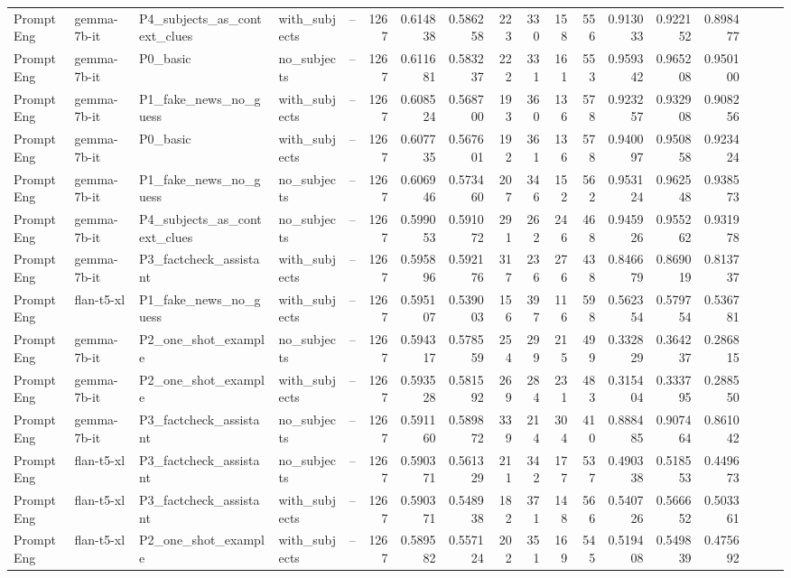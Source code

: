 \begin{landscape}
\begin{longtable}{l P{2.9cm} P{4cm} l P{2.2cm} r r r r r r r r r r r r r}
PromptEng & gemma-7b-it & P4\_subjects\_as\_context\_clues & with\_subjects & -- & 1267 & 0.614838 & 0.586258 & 223 & 330 & 158 & 556 & 0.913033 & 0.922152 & 0.898477\\
PromptEng & gemma-7b-it & P0\_basic & no\_subjects & -- & 1267 & 0.611681 & 0.583237 & 222 & 331 & 161 & 553 & 0.959342 & 0.965208 & 0.950100\\
PromptEng & gemma-7b-it & P1\_fake\_news\_no\_guess & with\_subjects & -- & 1267 & 0.608524 & 0.568700 & 193 & 360 & 136 & 578 & 0.923257 & 0.932908 & 0.908256 \\
PromptEng & gemma-7b-it & P0\_basic & with\_subjects & -- & 1267 & 0.607735 & 0.567601 & 192 & 361 & 136 & 578 & 0.940097 & 0.950858 & 0.923424\\
PromptEng & gemma-7b-it & P1\_fake\_news\_no\_guess & no\_subjects & -- & 1267 & 0.606946 & 0.573460 & 207 & 346 & 152 & 562 & 0.953124 & 0.962548 & 0.938573\\
PromptEng & gemma-7b-it & P4\_subjects\_as\_context\_clues & no\_subjects & -- & 1267 & 0.599053 & 0.591072 & 291 & 262 & 246 & 468 & 0.945926 & 0.955262 & 0.931978\\
PromptEng & gemma-7b-it & P3\_factcheck\_assistant & with\_subjects & -- & 1267 & 0.595896 & 0.592176 & 317 & 236 & 276 & 438 & 0.846679 & 0.869019 & 0.813737\\
PromptEng & flan-t5-xl & P1\_fake\_news\_no\_guess & with\_subjects & -- & 1267 & 0.595107 & 0.539003 & 156 & 397 & 116 & 598 & 0.562354 & 0.579754 & 0.536781\\
PromptEng & gemma-7b-it & P2\_one\_shot\_example & no\_subjects & -- & 1267 & 0.594317 & 0.578559 & 254 & 299 & 215 & 499 & 0.332829 & 0.364237 & 0.286815\\
PromptEng & gemma-7b-it & P2\_one\_shot\_example & with\_subjects & -- & 1267 & 0.593528 & 0.581592 & 269 & 284 & 231 & 483 & 0.315404 & 0.333795 & 0.288550\\
PromptEng & gemma-7b-it & P3\_factcheck\_assistant & no\_subjects & -- & 1267 & 0.591160 & 0.589872 & 339 & 214 & 304 & 410 & 0.888485 & 0.907464 & 0.861042\\
PromptEng & flan-t5-xl & P3\_factcheck\_assistant & no\_subjects & -- & 1267 & 0.590371 & 0.561329 & 211 & 342 & 177 & 537 & 0.490338 & 0.518553 & 0.449673\\
PromptEng & flan-t5-xl & P3\_factcheck\_assistant & with\_subjects & -- & 1267 & 0.590371 & 0.548938 & 182 & 371 & 148 & 566 & 0.540726 & 0.566652 & 0.503361\\
PromptEng & flan-t5-xl & P2\_one\_shot\_example & with\_subjects & -- & 1267 & 0.589582 & 0.557124 & 202 & 351 & 169 & 545 & 0.519408 & 0.549839 & 0.475692\\

\end{longtable}
\end{landscape}
